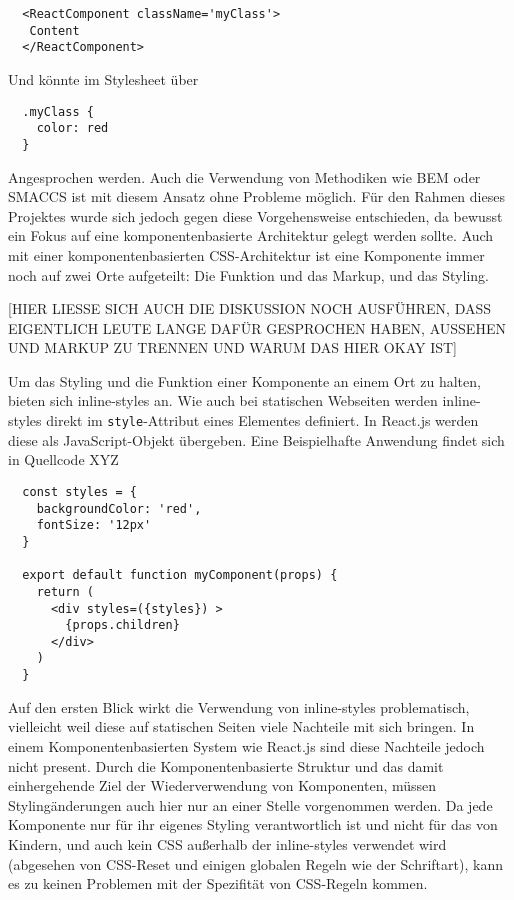 \begin{lstlisting}
  <ReactComponent className='myClass'>
   Content
  </ReactComponent>
\end{lstlisting}

Und könnte im Stylesheet über

\begin{lstlisting}
  .myClass {
    color: red
  }
\end{lstlisting}

Angesprochen werden. Auch die Verwendung von Methodiken wie BEM oder SMACCS ist mit diesem Ansatz ohne Probleme möglich.
Für den Rahmen dieses Projektes wurde sich jedoch gegen diese Vorgehensweise entschieden, da bewusst ein Fokus auf eine komponentenbasierte Architektur gelegt werden sollte. Auch mit einer komponentenbasierten CSS-Architektur ist eine Komponente immer noch auf zwei Orte aufgeteilt: Die Funktion und das Markup, und das Styling.

[HIER LIESSE SICH AUCH DIE DISKUSSION NOCH AUSFÜHREN, DASS EIGENTLICH LEUTE LANGE DAFÜR GESPROCHEN HABEN, AUSSEHEN UND MARKUP ZU TRENNEN UND WARUM DAS HIER OKAY IST]

Um das Styling und die Funktion einer Komponente an einem Ort zu halten, bieten sich inline-styles an. Wie auch bei statischen Webseiten werden inline-styles direkt im \verb|style|-Attribut eines Elementes definiert. In React.js werden diese als JavaScript-Objekt übergeben. Eine Beispielhafte Anwendung findet sich in Quellcode XYZ

\begin{lstlisting}
  const styles = {
    backgroundColor: 'red',
    fontSize: '12px'
  }

  export default function myComponent(props) {
    return (
      <div styles=({styles}) >
  		{props.children}
  	  </div>
    )
  }
\end{lstlisting}

Auf den ersten Blick wirkt die Verwendung von inline-styles problematisch, vielleicht weil diese auf statischen Seiten viele Nachteile mit sich bringen. In einem Komponentenbasierten System wie React.js sind diese Nachteile jedoch nicht present. Durch die Komponentenbasierte Struktur und das damit einhergehende Ziel der Wiederverwendung von Komponenten, müssen Stylingänderungen auch hier nur an einer Stelle vorgenommen werden. Da jede Komponente nur für ihr eigenes Styling verantwortlich ist und nicht für das von Kindern, und auch kein CSS außerhalb der inline-styles verwendet wird (abgesehen von CSS-Reset und einigen globalen Regeln wie der Schriftart), kann es zu keinen Problemen mit der Spezifität von CSS-Regeln kommen.

